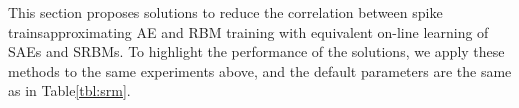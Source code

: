  
This section proposes \DIFdelbegin {}\DIFdelend \DIFaddbegin {}\DIFaddend solutions to reduce the correlation between spike trains\DIFdelbegin {}\DIFdelend \DIFaddbegin {}\DIFaddend approximating AE and RBM training with equivalent \DIFdelbegin {}\DIFdelend \DIFaddbegin {}\DIFaddend on-line learning of SAEs and SRBMs\DIFdelbegin {}\DIFdelend .
To highlight the performance of the solutions, we apply these methods to the same experiments above, and the default parameters are the same as in Table\DIFaddbegin \DIFadd{~}\DIFaddend \ref{tbl:srm}.
